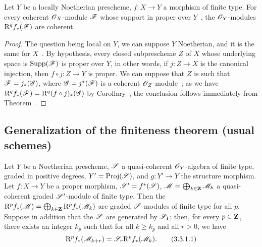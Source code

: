 \begin{cor}[3.2.4]
\label{3.3.2.4}
Let $Y$ be a locally Noetherian prescheme, $f:X\to Y$ a morphism of finite type.
For every coherent $\mathscr{O}_X$-module $\mathscr{F}$ whose support in proper over $Y$~, the $\mathscr{O}_Y$-modules $\mathrm{R}^q f_*(\mathscr{F})$ are coherent.
\end{cor}

\begin{proof}
\label{proof-3.3.2.4}
The question being local on $Y$, we can suppose $Y$ Noetherian, and it is the same for $X$~.
By hypothesis, every closed subprescheme $Z$ of $X$ whose underlying space is ${\mathop{\mathrm{Supp}}\nolimits}(\mathscr{F})$ is proper over $Y$, in other words, if $j:Z\to X$ is the canonical injection, then $f\circ j:Z\to Y$ is proper.
We can suppose that $Z$ is such that $\mathscr{F}=j_*(\mathscr{G})$, where $\mathscr{G}=j^*(\mathscr{F})$ is a coherent $\mathscr{O}_Z$-module~; as we have $\mathrm{R}^q f_*(\mathscr{F})=\mathrm{R}^q(f\circ j)_*(\mathscr{G})$ by Corollary~, the conclusion follows immediately from Theorem~.
\end{proof}

\subsection{Generalization of the finiteness theorem (usual schemes)}
\label{subsection:3.3.3}

\begin{prop}[3.3.1]
\label{3.3.3.1}
Let $Y$ be a Noetherian prescheme, $\mathscr{S}$ a quasi-coherent $\mathscr{O}_Y$-algebra of finite type, graded in positive degrees, $Y'={\mathop{\mathrm{Proj}}\nolimits}(\mathscr{S})$, and $g:Y'\to Y$ the structure morphism.
Let $f:X\to Y$ be a proper morphism, $\mathscr{S}'=f^*(\mathscr{S})$, $\mathscr{M}=\bigoplus_{k\in\mathbf{Z}}\mathscr{M}_k$ a quasi-coherent graded $\mathscr{S}'$-module of finite type.
Then the $\mathrm{R}^p f_*(\mathscr{M})=\bigoplus_{k\in\mathbf{Z}}\mathrm{R}^p f_*(\mathscr{M}_k)$ are graded $\mathscr{S}$-modules of finite type for all $p$.
Suppose in addition that the $\mathscr{S}$ are generated by $\mathscr{S}_1$; then, for every $p\in\mathbf{Z}$, there exists an integer $k_p$ such that for all $k\geq k_p$ and all $r>0$, we have
\[
\label{3.3.3.1.1}
  \mathrm{R}^p f_*(\mathscr{M}_{k+r})=\mathscr{S}_r\mathrm{R}^p f_*(\mathscr{M}_k).
  \tag{3.3.1.1}
\] 
\end{prop}

